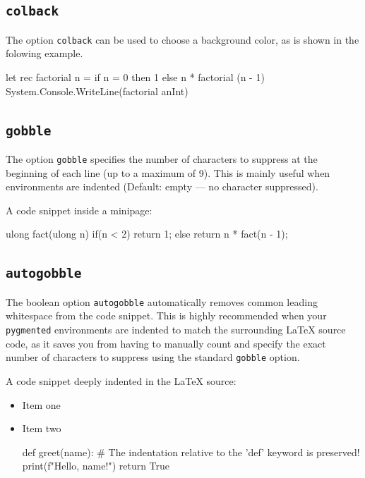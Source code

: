 \documentclass[10pt,a4paper]{article}
\begin{document}
\subsection{\texttt{colback}}

The option \verb|colback| can be used to choose a background color, as
is shown in the folowing example.

\begin{Example}
\begin{pygmented}[lang=fsharp,colback=green!25]
let rec factorial n =
    if n = 0
    then 1
    else n * factorial (n - 1)
System.Console.WriteLine(factorial anInt)
\end{pygmented}
\end{Example}


\subsection{\texttt{gobble}}

The option \verb|gobble| specifies the number of characters to suppress
at the beginning of each line (up to a maximum of 9). This is mainly
useful when environments are indented (Default: empty — no character
suppressed).

\begin{Example}
A code snippet inside a minipage:
\begin{minipage}[t]{.5\linewidth}
    \begin{pygmented}[lang=d,gobble=8]
        ulong fact(ulong n)
        {
          if(n < 2)
            return 1;
          else
            return n * fact(n - 1);
        }
      \end{pygmented}
\end{minipage}
\end{Example}


\subsection{\texttt{autogobble}}

The boolean option \verb|autogobble| automatically removes common leading
whitespace from the code snippet. This is highly recommended when your
\verb|pygmented| environments are indented to match the surrounding \LaTeX{}
source code, as it saves you from having to manually count and specify the
exact number of characters to suppress using the standard \verb|gobble|
option.

\begin{Example}
A code snippet deeply indented in the \LaTeX{} source:
\begin{itemize}
  \item Item one
  \item Item two
        \begin{pygmented}[lang=python,autogobble,colback=yellow!20]
          def greet(name):
              # The indentation relative to the 'def' keyword is preserved!
              print(f"Hello, {name}!")
              return True
        \end{pygmented}
\end{itemize}
\end{Example}
\end{document}

